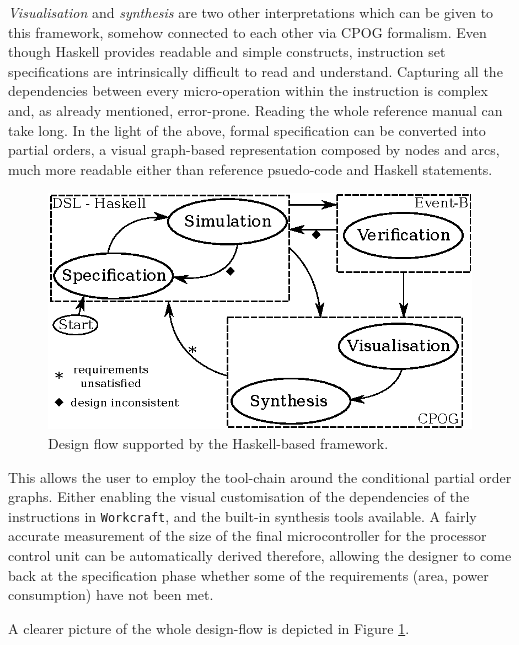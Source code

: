 \documentclass[conference]{IEEEtran}
\begin{document}
\textit{Visualisation} and \textit{synthesis} are two other
interpretations which can be given to this framework, somehow connected to each other via
CPOG formalism. Even though Haskell provides readable and simple constructs, instruction
set specifications are intrinsically difficult to read and understand.
Capturing all the dependencies between every micro-operation within the instruction is
complex and, as already mentioned, error-prone. Reading the whole reference manual can take
long. In the light of the above, formal specification can be converted into partial orders,
a visual graph-based representation composed by nodes and arcs, much more readable either
than reference psuedo-code and Haskell statements.

\begin{figure}[ht!]
\begin{center}
	\includegraphics[width=\linewidth]{IMG/flow.eps}
	\caption{Design flow supported by the Haskell-based framework.}
	\label{fig:flow}
\end{center}
\end{figure}

This allows the user to employ the tool-chain around the conditional partial order
graphs. Either enabling the visual customisation of the dependencies of the instructions in 
\verb|Workcraft|, and the built-in synthesis tools available. A fairly
accurate measurement of the size of the final microcontroller for the processor control
unit can be automatically derived therefore, allowing the designer to come back at the
specification phase whether some of the requirements (area, power consumption) have not been
met.

A clearer picture of the whole design-flow is depicted in Figure \ref{fig:flow}.

\end{document}
